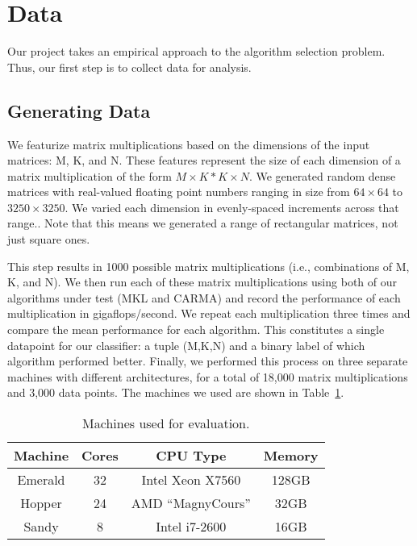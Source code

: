 \section{Data}
Our project takes an empirical approach to the algorithm selection problem.
Thus, our first step is to collect data for analysis.

\subsection{Generating Data}
We featurize matrix multiplications based on the dimensions of the input matrices: M, K, and N.
These features represent the size of each dimension of a matrix multiplication of the form $M\times{K} * K\times{N}$.
We generated random dense matrices with real-valued floating point numbers ranging in size from $64\times{64}$ to $3250\times{3250}$.
We varied each dimension in evenly-spaced increments across that range..
Note that this means we generated a range of rectangular matrices, not just square ones.

This step results in 1000 possible matrix multiplications (i.e., combinations of M, K, and N).
We then run each of these matrix multiplications using both of our algorithms under test (MKL and CARMA) and record the performance of each multiplication in gigaflops/second.
We repeat each multiplication three times and compare the mean performance for each algorithm.
This constitutes a single datapoint for our classifier: a tuple (M,K,N) and a binary label of which algorithm performed better.
Finally, we performed this process on three separate machines with different architectures, for a total of 18,000 matrix multiplications and 3,000 data points.
The machines we used are shown in Table~\ref{t:machines}.


\begin{table}[t]
    \begin{center}
        \begin{tabular}{c|c|c|c}
            Machine & Cores & CPU Type & Memory \\ \hline
            Emerald & 32 & Intel Xeon X7560 & 128GB \\
            Hopper & 24 & AMD ``MagnyCours'' & 32GB \\
            Sandy & 8 & Intel i7-2600 & 16GB \\
        \end{tabular}
    \end{center}
    \caption{Machines used for evaluation.}
    \label{t:machines}
\end{table}

